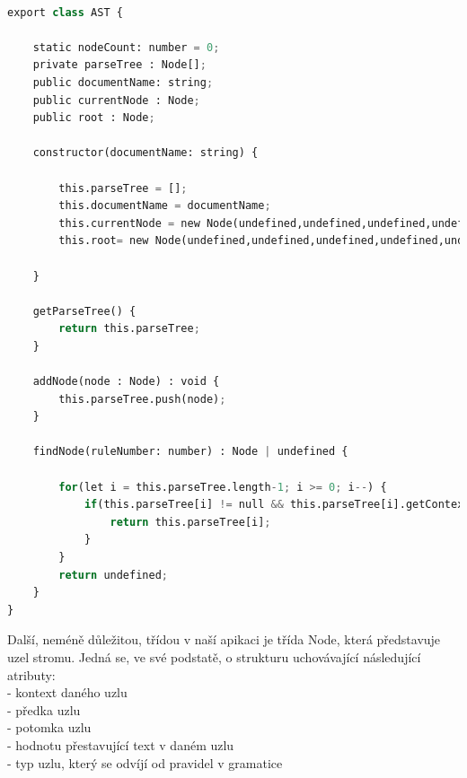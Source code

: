 \documentclass[czech,master,dept460,male,cpp,cpdeclaration]{diploma}
\begin{document}
\begin{center}
\begin{lstlisting}[language=Python,label=src:PythonListing,caption={třída AST v jazyce Typescript}]

export class AST {

    static nodeCount: number = 0; 
    private parseTree : Node[];
    public documentName: string;
    public currentNode : Node;
    public root : Node;

    constructor(documentName: string) {
        
        this.parseTree = [];
        this.documentName = documentName;
        this.currentNode = new Node(undefined,undefined,undefined,undefined,undefined);
        this.root= new Node(undefined,undefined,undefined,undefined,undefined);

    }

    getParseTree() {
        return this.parseTree;
    }

    addNode(node : Node) : void {
        this.parseTree.push(node);
    }

    findNode(ruleNumber: number) : Node | undefined {

        for(let i = this.parseTree.length-1; i >= 0; i--) {
            if(this.parseTree[i] != null && this.parseTree[i].getContext()?.ruleIndex === ruleNumber) {
                return this.parseTree[i];
            }
        }
        return undefined;
    }
}

\end{lstlisting}
\end{center}


Další, neméně důležitou, třídou v naší apikaci je třída Node, která představuje uzel stromu. Jedná se, ve své podstatě, o strukturu uchovávající následující atributy:\\
	- kontext daného uzlu\\
	- předka uzlu\\
	- potomka uzlu\\
	- hodnotu přestavující text v daném uzlu\\
	- typ uzlu, který se odvíjí od pravidel v gramatice\\
\end{document}

